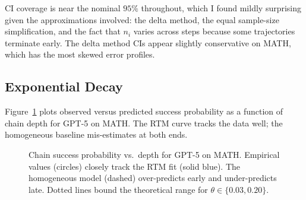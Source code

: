 \documentclass[11pt]{article}
\theoremstyle{plain}
\theoremstyle{definition}
\newcommand{\Prob}{\mathbb{P}}
\newcommand{\correct}{\textsc{correct}}
\begin{document}
CI coverage is near the nominal $95\%$ throughout, which I found mildly
surprising given the approximations involved: the delta method, the equal
sample-size simplification, and the fact that $n_i$ varies across steps
because some trajectories terminate early. The delta method CIs appear slightly
conservative on MATH, which has the most skewed error profiles.

\subsection{Exponential Decay}

Figure~\ref{fig:chain-decay} plots observed versus predicted success probability
as a function of chain depth for GPT-5 on MATH. The RTM curve tracks the data
well; the homogeneous baseline mis-estimates at both ends.

\begin{figure}[ht]
\centering
{}
\caption{Chain success probability vs.\ depth for GPT-5 on MATH. Empirical
values (circles) closely track the RTM fit (solid blue). The homogeneous
model (dashed) over-predicts early and under-predicts late. Dotted lines
bound the theoretical range for $\theta \in \{0.03, 0.20\}$.}
\label{fig:chain-decay}
\end{figure}
\end{document}

